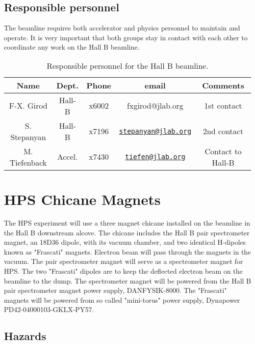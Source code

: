 \documentclass[11pt]{report}
\begin{document}
\subsection{Responsible personnel}

The beamline requires both accelerator and physics personnel to maintain and operate. It is very important that both groups stay in contact with each other to coordinate any work on the Hall B beamline.  

 \begin{table}[!ht]
 \centering
 \begin{tabular}{|c|c|c|c|c|}
\hline
 Name&Dept.&Phone&email&Comments \\ \hline
  F-X. Girod & Hall-B&x6002&fxgirod@jlab.org& 1st contact  \\ \hline
 S. Stepanyan & Hall-B&x7196&\href{mailto:stepanyan@jlab.org}{\nolinkurl{stepanyan@jlab.org}}&2nd contact \\ \hline
  M. Tiefenback &Accel.&x7430&\href{mailto:tiefen@jlab.org}{\nolinkurl{tiefen@jlab.org}}& Contact to Hall-B \\ \hline
\end{tabular}
\caption{Responsible personnel for the Hall B beamline.} 
\label{tb:beam}
\end{table}


\section{HPS Chicane Magnets}
\indent

The HPS experiment will use a three magnet chicane installed on the beamline in the Hall B downstream alcove. The chicane includes the Hall B pair spectrometer magnet, an 18D36 dipole, with its vacuum chamber, and two identical H-dipoles known as "Frascati" magnets. Electron beam will pass through the magnets in the vacuum. The pair spectrometer magnet will serve as a spectrometer magnet for HPS. The two "Frascati" dipoles are to keep the deflected electron beam on the beamline to the dump. The spectrometer magnet will be powered from the Hall B pair spectrometer magnet power supply, DANFYSIK-8000. The "Frascati" magnets will be powered from so called "mini-torus" power supply, Dynapower PD42-04000103-GKLX-PY57.   
 
\subsection{Hazards} 
\indent
\end{document}
